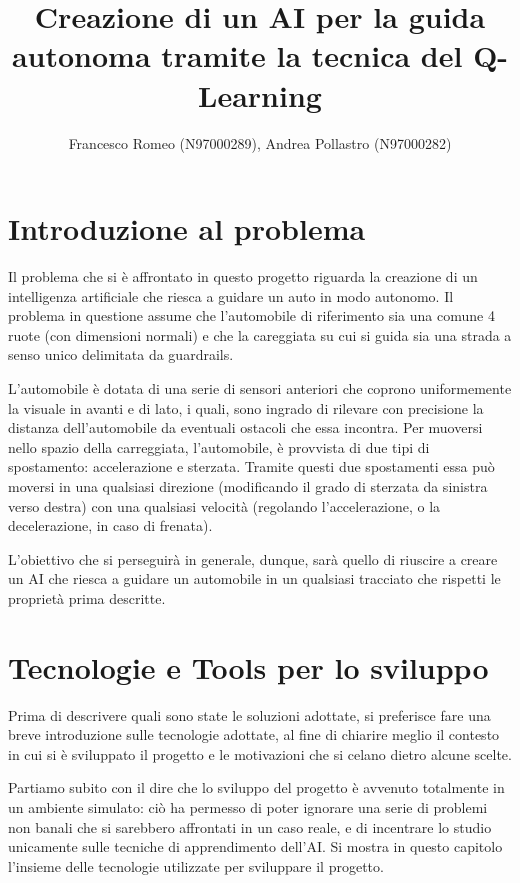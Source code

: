\documentclass[a4paper,11pt,twoside]{report} %
\begin{document}
\author{Francesco Romeo (N97000289), Andrea Pollastro (N97000282)}
\title{Creazione di un AI per la guida autonoma tramite la tecnica del Q-Learning}
\maketitle  %

\tableofcontents %


\chapter{Introduzione al problema}

Il problema che si è affrontato in questo progetto riguarda la creazione di un intelligenza artificiale che riesca a guidare un auto in modo autonomo. Il problema in questione assume che l'automobile di riferimento sia una comune 4 ruote (con dimensioni normali) e che la careggiata su cui si guida sia una strada a senso unico delimitata da guardrails.

L'automobile è dotata di una serie di sensori anteriori che coprono uniformemente la visuale in avanti e di lato, i quali, sono ingrado di rilevare con precisione la distanza dell'automobile da eventuali ostacoli che essa incontra. Per muoversi nello spazio della carreggiata, l'automobile, è provvista di due tipi di spostamento: accelerazione e sterzata. Tramite questi due spostamenti essa può moversi in una qualsiasi direzione (modificando il grado di sterzata da sinistra verso destra) con una qualsiasi velocità (regolando l'accelerazione, o la decelerazione, in caso di frenata).

L'obiettivo che si perseguirà in generale, dunque, sarà quello di riuscire a creare un AI che riesca a guidare un automobile in un qualsiasi tracciato che rispetti le proprietà prima descritte.

\chapter{Tecnologie e Tools per lo sviluppo}

Prima di descrivere quali sono state le soluzioni adottate, si preferisce fare una breve introduzione sulle tecnologie adottate, al fine di chiarire meglio il contesto in cui si è sviluppato il progetto e le motivazioni che si celano dietro alcune scelte.

Partiamo subito con il dire che lo sviluppo del progetto è avvenuto totalmente in un ambiente simulato: ciò ha permesso di poter ignorare una serie di problemi non banali che si sarebbero affrontati in un caso reale, e di incentrare lo studio unicamente sulle tecniche di apprendimento dell'AI. Si mostra in questo capitolo l'insieme delle tecnologie utilizzate per sviluppare il progetto.
\end{document}
